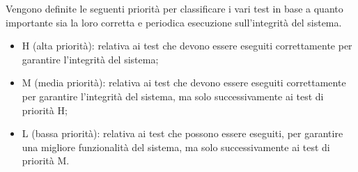 Vengono definite le seguenti priorità per classificare i vari test in base a quanto importante sia la 
loro corretta e periodica esecuzione sull'integrità del sistema.
\begin{itemize}
    \item H (alta priorità): relativa ai test che devono essere eseguiti correttamente per garantire l'integrità
    del sistema;
    \item M (media priorità): relativa ai test che devono essere eseguiti correttamente per garantire l'integrità
    del sistema, ma solo successivamente ai test di priorità H;
    \item L (bassa priorità): relativa ai test che possono essere eseguiti, per garantire una migliore funzionalità
    del sistema, ma solo successivamente ai test di priorità M.
\end{itemize}


